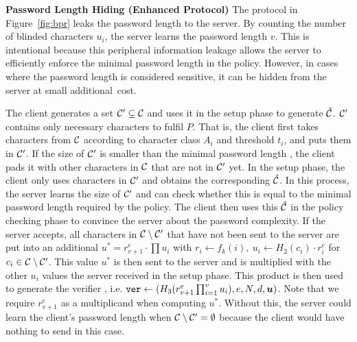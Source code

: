 \noindent\textbf{Password Length Hiding (Enhanced Protocol)} 
The protocol in Figure~\ref{fig:bpr} leaks the password length to the server. By counting the number of blinded characters $u_i$, the server learns the password length $v$. 
This is intentional because this peripheral information leakage allows the server to efficiently enforce the minimal password length in the policy. 
However, in cases where the password length is considered sensitive, it can be hidden from the  server at small additional~cost.

The client generates a set $\mathcal{C}'\subseteq\mathcal{C}$ and uses it in the setup phase to generate $\hat{\mathcal{C}}$. 
$\mathcal{C}'$ contains only necessary characters to fulfil $P$. 
That is, the client first takes characters from $\mathcal{C}$ according to character class $A_i$ and threshold $t_i$, and puts them in $\mathcal{C}'$.
If the size of $\mathcal{C}'$ is smaller than the minimal password length \min, the client pads it with other characters in $\mathcal{C}$ that are not in $\mathcal{C}'$ yet. 
In the setup phase, the client only uses characters in $\mathcal{C}'$ and obtains the corresponding $\hat{\mathcal{C}}$. In this process, the server learns the size of $\mathcal{C}'$ and can check whether this is equal to the minimal password length required by the policy. 
The client then uses this $\hat{\mathcal{C}}$ in the policy checking phase to convince the server about the password complexity. 
If the server accepts, all characters in $\mathcal{C}\setminus\mathcal{C}'$ that have not been sent to the server are put into an additional $u^\ast=r_{v+1}^e\cdot\prod u_i$ with $r_i\gets f_k(i),~ u_i\gets H_2(c_i)\cdot r_i^e$ for $c_i\in\mathcal{C}\setminus\mathcal{C}'$. 
This value $u^\ast$ is then sent to the server and is multiplied with the other $u_i$ values the server received in the setup phase.
This product is then used to generate the verifier \ver, i.e. $\mathtt{ver}\gets(H_3(r_{v+1}^e\prod_{i=1}^v u_i), e, N, d, \bm{u})$. 
Note that we require $r_{v+1}^e$ as a multiplicand when computing $u^\ast$. 
Without this, the server could learn the client's password length when $\mathcal{C}\setminus\mathcal{C}'=\emptyset$ because the client would have nothing to send in this case. 

